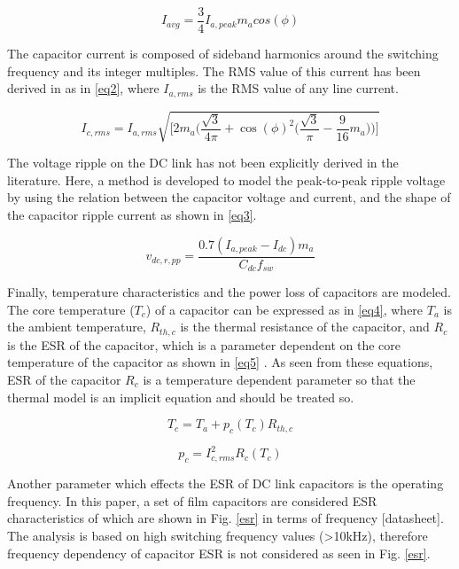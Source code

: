 \documentclass[conference,a4paper,twocolumn]{IEEEtran}
\begin{document}
\begin{equation}
\label{eq1}
I_{avg} = \frac{3}{4}I_{a,peak}m_acos(\phi)
\end{equation}


The capacitor current is composed of sideband harmonics around the switching frequency and its integer multiples. The RMS value of this current has been derived in \cite{Su2010,Bianchi2003} as in \ref{eq2}, where $I_{a,rms}$ is the RMS value of any line current.

\begin{equation}
\label{eq2}
I_{c,rms} = I_{a,rms}\sqrt{\bigg[2m_a\Big(\frac{\sqrt{3}}{4\pi}+\cos(\phi)^2\big(\frac{\sqrt{3}}{\pi}-\frac{9}{16}m_a\big)\Big)\bigg]}
\end{equation}


The voltage ripple on the DC link has not been explicitly derived in the literature. Here, a method is developed to model the peak-to-peak ripple voltage by using the relation between the capacitor voltage and current, and the shape of the capacitor ripple current as shown in \ref{eq3}.


\begin{equation}
\label{eq3}
v_{dc,r,pp} = \frac{0.7(I_{a,peak}-I_{dc})m_a}{C_{dc}f_{sw}}
\end{equation}


Finally, temperature characteristics and the power loss of capacitors are modeled. The core temperature ($T_c$) of a capacitor can be expressed as in \ref{eq4}, where $T_a$ is the ambient temperature, $R_{th,c}$ is the thermal resistance of the capacitor, and $R_c$ is the ESR of the capacitor, which is a parameter dependent on the core temperature of the capacitor as shown in \ref{eq5} \cite{Bianchi2003}. As seen from these equations, ESR of the capacitor $R_c$ is a temperature dependent parameter so that the thermal model is an implicit equation and should be treated so.


\begin{equation}
\label{eq4}
T_{c} = T_{a}+p_{c}(T_{c})R_{th,c}
\end{equation}


\begin{equation}
\label{eq5}
p_{c} = I_{c,rms}^2R_{c}(T_c)
\end{equation}

Another parameter which effects the ESR of DC link capacitors is the operating frequency. In this paper, a set of film capacitors are considered ESR characteristics of which are shown in Fig. \ref{esr} in terms of frequency [datasheet]. The analysis is based on high switching frequency values (>10kHz), therefore frequency dependency of capacitor ESR is not considered as seen in Fig. \ref{esr}. 
\end{document}
